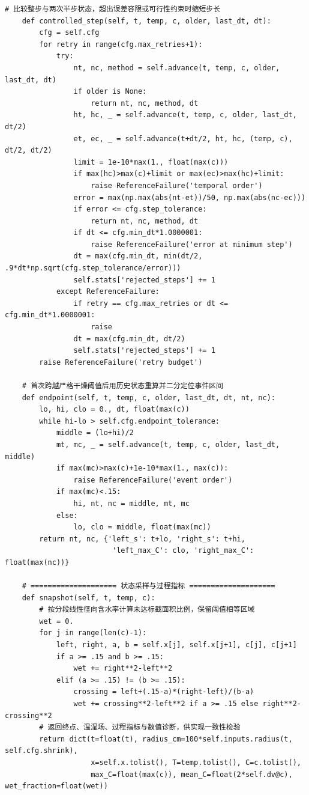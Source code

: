\begin{Verbatim}[fontsize=\scriptsize,breaklines=true,breakanywhere=true]
    # 比较整步与两次半步状态，超出误差容限或可行性约束时缩短步长
    def controlled_step(self, t, temp, c, older, last_dt, dt):
        cfg = self.cfg
        for retry in range(cfg.max_retries+1):
            try:
                nt, nc, method = self.advance(t, temp, c, older, last_dt, dt)
                if older is None:
                    return nt, nc, method, dt
                ht, hc, _ = self.advance(t, temp, c, older, last_dt, dt/2)
                et, ec, _ = self.advance(t+dt/2, ht, hc, (temp, c), dt/2, dt/2)
                limit = 1e-10*max(1., float(max(c)))
                if max(hc)>max(c)+limit or max(ec)>max(hc)+limit:
                    raise ReferenceFailure('temporal order')
                error = max(np.max(abs(nt-et))/50, np.max(abs(nc-ec)))
                if error <= cfg.step_tolerance:
                    return nt, nc, method, dt
                if dt <= cfg.min_dt*1.0000001:
                    raise ReferenceFailure('error at minimum step')
                dt = max(cfg.min_dt, min(dt/2, .9*dt*np.sqrt(cfg.step_tolerance/error)))
                self.stats['rejected_steps'] += 1
            except ReferenceFailure:
                if retry == cfg.max_retries or dt <= cfg.min_dt*1.0000001:
                    raise
                dt = max(cfg.min_dt, dt/2)
                self.stats['rejected_steps'] += 1
        raise ReferenceFailure('retry budget')

    # 首次跨越严格干燥阈值后用历史状态重算并二分定位事件区间
    def endpoint(self, t, temp, c, older, last_dt, dt, nt, nc):
        lo, hi, clo = 0., dt, float(max(c))
        while hi-lo > self.cfg.endpoint_tolerance:
            middle = (lo+hi)/2
            mt, mc, _ = self.advance(t, temp, c, older, last_dt, middle)
            if max(mc)>max(c)+1e-10*max(1., max(c)):
                raise ReferenceFailure('event order')
            if max(mc)<.15:
                hi, nt, nc = middle, mt, mc
            else:
                lo, clo = middle, float(max(mc))
        return nt, nc, {'left_s': t+lo, 'right_s': t+hi,
                         'left_max_C': clo, 'right_max_C': float(max(nc))}

    # ==================== 状态采样与过程指标 ====================
    def snapshot(self, t, temp, c):
        # 按分段线性径向含水率计算未达标截面积比例，保留阈值相等区域
        wet = 0.
        for j in range(len(c)-1):
            left, right, a, b = self.x[j], self.x[j+1], c[j], c[j+1]
            if a >= .15 and b >= .15:
                wet += right**2-left**2
            elif (a >= .15) != (b >= .15):
                crossing = left+(.15-a)*(right-left)/(b-a)
                wet += crossing**2-left**2 if a >= .15 else right**2-crossing**2
        # 返回终点、温湿场、过程指标与数值诊断，供实现一致性检验
        return dict(t=float(t), radius_cm=100*self.inputs.radius(t, self.cfg.shrink),
                    x=self.x.tolist(), T=temp.tolist(), C=c.tolist(),
                    max_C=float(max(c)), mean_C=float(2*self.dv@c), wet_fraction=float(wet))


\end{Verbatim}
